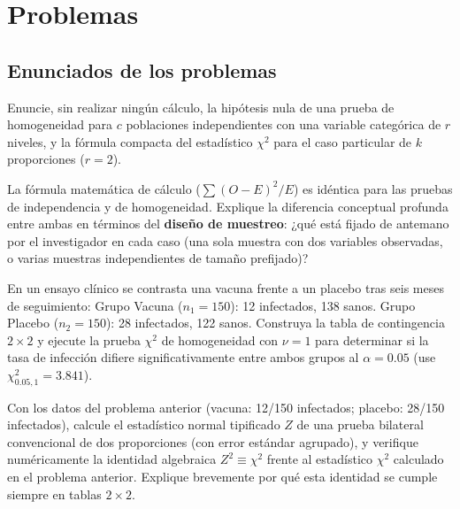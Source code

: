 \section*{Problemas}

\subsection*{Enunciados de los problemas}

\begin{problema}
	\label{prob:7ccb176}
	Enuncie, sin realizar ningún cálculo, la hipótesis nula de una prueba de homogeneidad para $c$ poblaciones independientes con una variable categórica de $r$ niveles, y la fórmula compacta del estadístico $\chi^2$ para el caso particular de $k$ proporciones ($r=2$).
\end{problema}

\begin{problema}
	\label{prob:44ef899}
	La fórmula matemática de cálculo ($\sum(O-E)^2/E$) es idéntica para las pruebas de independencia y de homogeneidad. Explique la diferencia conceptual profunda entre ambas en términos del \textbf{diseño de muestreo}: ¿qué está fijado de antemano por el investigador en cada caso (una sola muestra con dos variables observadas, o varias muestras independientes de tamaño prefijado)?
\end{problema}

\begin{problema}
	\label{prob:3a99a23}
	En un ensayo clínico se contrasta una vacuna frente a un placebo tras seis meses de seguimiento: Grupo Vacuna ($n_1=150$): 12 infectados, 138 sanos. Grupo Placebo ($n_2=150$): 28 infectados, 122 sanos. Construya la tabla de contingencia $2\times2$ y ejecute la prueba $\chi^2$ de homogeneidad con $\nu=1$ para determinar si la tasa de infección difiere significativamente entre ambos grupos al $\alpha=0.05$ (use $\chi^2_{0.05,1}=3.841$).
\end{problema}

\begin{problema}
	\label{prob:a98f897}
	Con los datos del problema anterior (vacuna: 12/150 infectados; placebo: 28/150 infectados), calcule el estadístico normal tipificado $Z$ de una prueba bilateral convencional de dos proporciones (con error estándar agrupado), y verifique numéricamente la identidad algebraica $Z^2\equiv\chi^2$ frente al estadístico $\chi^2$ calculado en el problema anterior. Explique brevemente por qué esta identidad se cumple siempre en tablas $2\times2$.
\end{problema}

